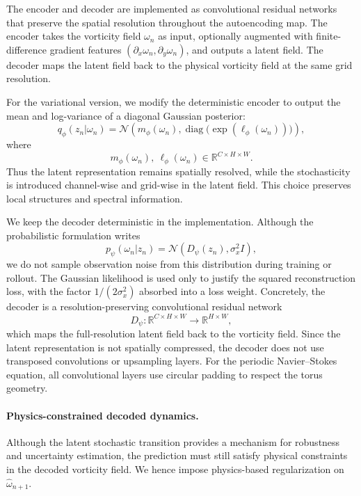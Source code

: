 \documentclass[11pt]{article}
\begin{document}
The encoder and decoder are implemented as convolutional residual networks that preserve the spatial resolution throughout the autoencoding map. The encoder takes the vorticity field $\omega_n$ as input, optionally augmented with finite-difference gradient features $(\partial_x\omega_n,\partial_y\omega_n)$, and outputs a latent field. The decoder maps the latent field back to the physical vorticity field at the same grid resolution.

For the variational version, we modify the deterministic encoder to output the mean and log-variance of a diagonal Gaussian posterior:
\begin{equation}
    q_\phi(z_n|\omega_n)
    =
    \mathcal N\left(
        m_\phi(\omega_n),
        \operatorname{diag}\bigl(\exp(\ell_\phi(\omega_n))\bigr)
    \right),
\end{equation}
where
\begin{equation}
    m_\phi(\omega_n),\ \ell_\phi(\omega_n)
    \in
    \mathbb R^{C\times H\times W}.
\end{equation}
Thus the latent representation remains spatially resolved, while the stochasticity is introduced channel-wise and grid-wise in the latent field. This choice preserves local structures and spectral information.

We keep the decoder deterministic in the implementation. Although the probabilistic formulation writes
\[
    p_\psi(\omega_n|z_n)
    =
    \mathcal N(D_\psi(z_n),\sigma_x^2 I),
\]
we do not sample observation noise from this distribution during training or rollout. The Gaussian likelihood is used only to justify the squared reconstruction loss, with the factor $1/(2\sigma_x^2)$ absorbed into a loss weight. Concretely, the decoder is a resolution-preserving convolutional residual network
\[
    D_\psi:\mathbb R^{C\times H\times W}\to \mathbb R^{H\times W},
\]
which maps the full-resolution latent field back to the vorticity field. Since the latent representation is not spatially compressed, the decoder does not use transposed convolutions or upsampling layers. For the periodic Navier--Stokes equation, all convolutional layers use circular padding to respect the torus geometry.

\paragraph{Physics-constrained decoded dynamics.}
Although the latent stochastic transition provides a mechanism for robustness and uncertainty estimation, the prediction must still satisfy physical constraints in the decoded vorticity field. We hence impose physics-based regularization on $\widehat{\omega}_{n+1}$.
\end{document}
